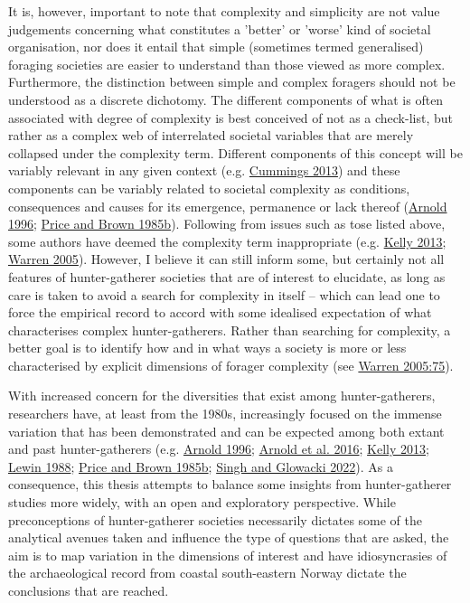 \documentclass[
  12pt,
  a4paper,
  oneside]{book}
\begin{document}
It is, however, important to note that complexity and simplicity are not value judgements concerning what constitutes a 'better' or 'worse' kind of societal organisation, nor does it entail that simple (sometimes termed generalised) foraging societies are easier to understand than those viewed as more complex. Furthermore, the distinction between simple and complex foragers should not be understood as a discrete dichotomy. The different components of what is often associated with degree of complexity is best conceived of not as a check-list, but rather as a complex web of interrelated societal variables that are merely collapsed under the complexity term. Different components of this concept will be variably relevant in any given context (e.g. \protect\hyperlink{ref-cummings2013}{Cummings 2013}) and these components can be variably related to societal complexity as conditions, consequences and causes for its emergence, permanence or lack thereof (\protect\hyperlink{ref-arnold1996}{Arnold 1996}; \protect\hyperlink{ref-price1985a}{Price and Brown 1985b}). Following from issues such as tose listed above, some authors have deemed the complexity term inappropriate (e.g. \protect\hyperlink{ref-kelly2013}{Kelly 2013}; \protect\hyperlink{ref-warren2005}{Warren 2005}). However, I believe it can still inform some, but certainly not all features of hunter-gatherer societies that are of interest to elucidate, as long as care is taken to avoid a search for complexity in itself -- which can lead one to force the empirical record to accord with some idealised expectation of what characterises complex hunter-gatherers. Rather than searching for complexity, a better goal is to identify how and in what ways a society is more or less characterised by explicit dimensions of forager complexity (see \protect\hyperlink{ref-warren2005}{Warren 2005:75}).

With increased concern for the diversities that exist among hunter-gatherers, researchers have, at least from the 1980s, increasingly focused on the immense variation that has been demonstrated and can be expected among both extant and past hunter-gatherers (e.g. \protect\hyperlink{ref-arnold1996}{Arnold 1996}; \protect\hyperlink{ref-arnold2016}{Arnold et al. 2016}; \protect\hyperlink{ref-kelly2013}{Kelly 2013}; \protect\hyperlink{ref-lewin1988}{Lewin 1988}; \protect\hyperlink{ref-price1985a}{Price and Brown 1985b}; \protect\hyperlink{ref-singh2022}{Singh and Glowacki 2022}). As a consequence, this thesis attempts to balance some insights from hunter-gatherer studies more widely, with an open and exploratory perspective. While preconceptions of hunter-gatherer societies necessarily dictates some of the analytical avenues taken and influence the type of questions that are asked, the aim is to map variation in the dimensions of interest and have idiosyncrasies of the archaeological record from coastal south-eastern Norway dictate the conclusions that are reached.
\end{document}
